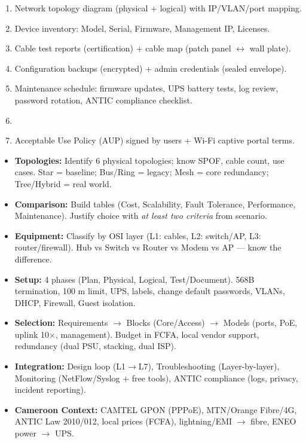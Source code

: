 \documentclass[11pt]{article}
\begin{document}
\begin{corrige}[Exercise 10]
\begin{enumerate}
\item Network topology diagram (physical + logical) with IP/VLAN/port mapping.
\item Device inventory: Model, Serial, Firmware, Management IP, Licenses.
\item Cable test reports (certification) + cable map (patch panel $\leftrightarrow$ wall plate).
\item Configuration backups (encrypted) + admin credentials (sealed envelope).
\item Maintenance schedule: firmware updates, UPS battery tests, log review, password rotation, ANTIC compliance checklist.
\item\item Acceptable Use Policy (AUP) signed by users + Wi-Fi captive portal terms.
\end{enumerate}
\end{corrige}

\begin{aretenir}
\begin{itemize}
\item \textbf{Topologies:} Identify 6 physical topologies; know SPOF, cable count, use cases. Star = baseline; Bus/Ring = legacy; Mesh = core redundancy; Tree/Hybrid = real world.
\item \textbf{Comparison:} Build tables (Cost, Scalability, Fault Tolerance, Performance, Maintenance). Justify choice with \emph{at least two criteria} from scenario.
\item \textbf{Equipment:} Classify by OSI layer (L1: cables, L2: switch/AP, L3: router/firewall). Hub vs Switch vs Router vs Modem vs AP — know the difference.
\item \textbf{Setup:} 4 phases (Plan, Physical, Logical, Test/Document). 568B termination, 100 m limit, UPS, labels, change default passwords, VLANs, DHCP, Firewall, Guest isolation.
\item \textbf{Selection:} Requirements $\rightarrow$ Blocks (Core/Access) $\rightarrow$ Models (ports, PoE, uplink 10×, management). Budget in FCFA, local vendor support, redundancy (dual PSU, stacking, dual ISP).
\item \textbf{Integration:} Design loop (L1$\rightarrow$L7), Troubleshooting (Layer-by-layer), Monitoring (NetFlow/Syslog + free tools), ANTIC compliance (logs, privacy, incident reporting).
\item \textbf{Cameroon Context:} CAMTEL GPON (PPPoE), MTN/Orange Fibre/4G, ANTIC Law 2010/012, local prices (FCFA), lightning/EMI $\rightarrow$ fibre, ENEO power $\rightarrow$ UPS.
\end{itemize}
\end{aretenir}
\end{document}
